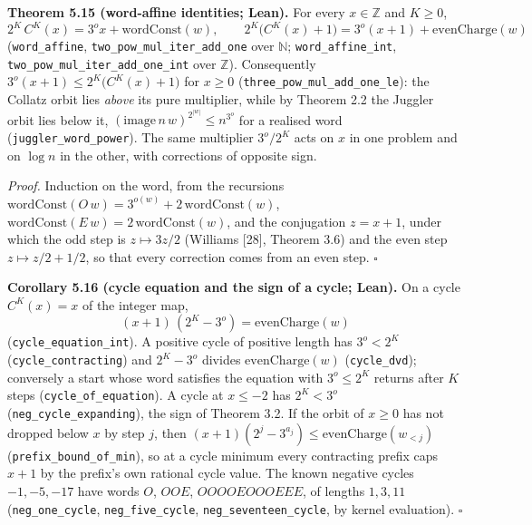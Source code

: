 \documentclass[12pt]{article}
\begin{document}
\textbf{Theorem 5.15 (word-affine identities; Lean).} For every
\(x\in\mathbb Z\) and \(K\ge0\), \[
2^K\,C^K(x)=3^{o}x+\mathrm{wordConst}(w),\qquad
2^K\bigl(C^K(x)+1\bigr)=3^{o}(x+1)+\mathrm{evenCharge}(w)
\] (\texttt{\nolinkurl{word_affine}},
\texttt{\nolinkurl{two_pow_mul_iter_add_one}} over \(\mathbb N\);
\texttt{\nolinkurl{word_affine_int}},
\texttt{\nolinkurl{two_pow_mul_iter_add_one_int}} over \(\mathbb Z\)).
Consequently \(3^o(x+1)\le 2^K\bigl(C^K(x)+1\bigr)\) for \(x\ge 0\)
(\texttt{\nolinkurl{three_pow_mul_add_one_le}}): the Collatz orbit lies
\emph{above} its pure multiplier, while by Theorem 2.2 the Juggler orbit
lies below it, \((\mathrm{image}\,n\,w)^{2^{|w|}}\le n^{3^{o}}\) for a
realised word (\texttt{\nolinkurl{juggler_word_power}}). The same
multiplier \(3^o/2^K\) acts on \(x\) in one problem and on \(\log n\) in
the other, with corrections of opposite sign.

\emph{Proof.} Induction on the word, from the recursions
\(\mathrm{wordConst}(O\,w)=3^{o(w)}+2\,\mathrm{wordConst}(w)\),
\(\mathrm{wordConst}(E\,w)=2\,\mathrm{wordConst}(w)\), and the
conjugation \(z=x+1\), under which the odd step is \(z\mapsto 3z/2\)
(Williams {[}28{]}, Theorem 3.6) and the even step \(z\mapsto z/2+1/2\),
so that every correction comes from an even step. \(\square\)

\textbf{Corollary 5.16 (cycle equation and the sign of a cycle; Lean).}
On a cycle \(C^K(x)=x\) of the integer map, \[
(x+1)\,(2^K-3^o)=\mathrm{evenCharge}(w)
\] (\texttt{\nolinkurl{cycle_equation_int}}). A positive cycle of
positive length has \(3^o<2^K\) (\texttt{\nolinkurl{cycle_contracting}})
and \(2^K-3^o\) divides \(\mathrm{evenCharge}(w)\)
(\texttt{\nolinkurl{cycle_dvd}}); conversely a start whose word
satisfies the equation with \(3^o\le2^K\) returns after \(K\) steps
(\texttt{\nolinkurl{cycle_of_equation}}). A cycle at \(x\le-2\) has
\(2^K<3^o\) (\texttt{\nolinkurl{neg_cycle_expanding}}), the sign of
Theorem 3.2. If the orbit of \(x\ge0\) has not dropped below \(x\) by
step \(j\), then \((x+1)(2^j-3^{a_j})\le\mathrm{evenCharge}(w_{<j})\)
(\texttt{\nolinkurl{prefix_bound_of_min}}), so at a cycle minimum every
contracting prefix caps \(x+1\) by the prefix's own rational cycle
value. The known negative cycles \(-1,-5,-17\) have words \(O\),
\(OOE\), \(OOOOEOOOEEE\), of lengths \(1,3,11\)
(\texttt{\nolinkurl{neg_one_cycle}},
\texttt{\nolinkurl{neg_five_cycle}},
\texttt{\nolinkurl{neg_seventeen_cycle}}, by kernel evaluation).
\(\square\)
\end{document}
